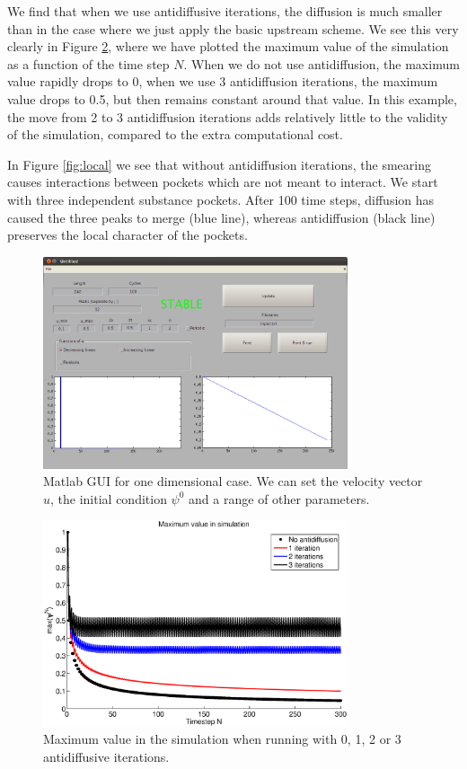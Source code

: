 \documentclass[10pt, a4paper]{article}
\begin{document}
We find that when we use antidiffusive iterations, the diffusion is much smaller than in the case where we just apply the basic upstream scheme. We see this very clearly in Figure \ref{fig:maxs}, where we have plotted the maximum value of the simulation as a function of the time step $N$. When we do not use antidiffusion, the maximum value rapidly drops to 0, when we use 3 antidiffusion iterations, the maximum value drops to 0.5, but then remains constant around that value. In this example, the move from 2 to 3 antidiffusion iterations adds relatively little to the validity of the simulation, compared to the extra computational cost.

In Figure \ref{fig:local} we see that without antidiffusion iterations, the smearing causes interactions between pockets which are not meant to interact. We start with three independent substance pockets. After 100 time steps, diffusion has caused the three peaks to merge (blue line), whereas antidiffusion (black line) preserves the local character of the pockets.



\begin{figure}
\centering
 \includegraphics[width=0.8\textwidth]{1dscreenshot.png}
 \caption{Matlab GUI for one dimensional case. We can set the velocity vector $u$, the initial condition $\psi^0$ and a range of other parameters.}
 \label{fig:1dgui}
\end{figure}

\begin{figure}
\centering
 \includegraphics[width=0.8\textwidth]{maxs}
 \caption{Maximum value in the simulation when running with 0, 1, 2 or 3 antidiffusive iterations.}
 \label{fig:maxs}
\end{figure}
\end{document}
